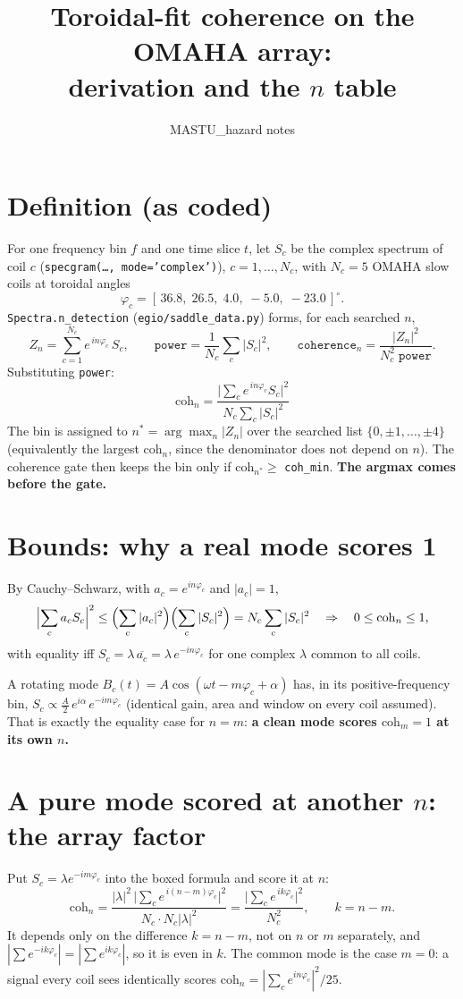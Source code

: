 \documentclass[11pt]{article}
\title{Toroidal-fit coherence on the OMAHA array:\\derivation and the $n$ table}
\author{MASTU\_hazard notes}
\date{}
\begin{document}
\maketitle

\section{Definition (as coded)}
For one frequency bin $f$ and one time slice $t$, let $S_c$ be the complex
spectrum of coil $c$ (\texttt{specgram(\ldots, mode='complex')}),
$c=1,\dots,N_c$, with $N_c=5$ OMAHA slow coils at toroidal angles
\[
\varphi_c = [\,36.8,\;26.5,\;4.0,\;-5.0,\;-23.0\,]^\circ .
\]
\texttt{Spectra.n\_detection} (\texttt{egio/saddle\_data.py}) forms, for each searched $n$,
\[
Z_n = \sum_{c=1}^{N_c} e^{\,i n\varphi_c}\, S_c ,
\qquad
\texttt{power} = \frac{1}{N_c}\sum_c |S_c|^2 ,
\qquad
\texttt{coherence}_n = \frac{|Z_n|^2}{N_c^2\;\texttt{power}} .
\]
Substituting \texttt{power}:
\[
\boxed{\;\mathrm{coh}_n = \frac{\bigl|\sum_c e^{\,i n\varphi_c} S_c\bigr|^2}{N_c \sum_c |S_c|^2}\;}
\]
The bin is assigned to $n^\ast = \arg\max_n |Z_n|$ over the searched list
$\{0,\pm1,\dots,\pm4\}$ (equivalently the largest $\mathrm{coh}_n$, since the
denominator does not depend on $n$). The coherence gate then keeps the bin
only if $\mathrm{coh}_{n^\ast}\ge$ \texttt{coh\_min}.
\textbf{The argmax comes before the gate.}

\section{Bounds: why a real mode scores 1}
By Cauchy--Schwarz, with $a_c = e^{in\varphi_c}$ and $|a_c|=1$,
\[
\Bigl|\sum_c a_c S_c\Bigr|^2 \le \Bigl(\sum_c |a_c|^2\Bigr)\Bigl(\sum_c |S_c|^2\Bigr) = N_c\sum_c|S_c|^2
\quad\Rightarrow\quad 0\le \mathrm{coh}_n\le 1 ,
\]
with equality iff $S_c = \lambda\,\overline{a_c} = \lambda\, e^{-in\varphi_c}$
for one complex $\lambda$ common to all coils.

A rotating mode $B_c(t)=A\cos(\omega t - m\varphi_c + \alpha)$ has, in its
positive-frequency bin, $S_c \propto \tfrac{A}{2}\,e^{i\alpha}\,e^{-im\varphi_c}$
(identical gain, area and window on every coil assumed). That is exactly the
equality case for $n=m$: \textbf{a clean mode scores $\mathrm{coh}_m = 1$ at
its own $n$.}

\section{A pure mode scored at another $n$: the array factor}
Put $S_c = \lambda e^{-im\varphi_c}$ into the boxed formula and score it at $n$:
\[
\mathrm{coh}_n
= \frac{|\lambda|^2\,\bigl|\sum_c e^{\,i(n-m)\varphi_c}\bigr|^2}{N_c\cdot N_c|\lambda|^2}
= \frac{\bigl|\sum_c e^{\,ik\varphi_c}\bigr|^2}{N_c^2},
\qquad k = n-m .
\]
It depends only on the difference $k=n-m$, not on $n$ or $m$ separately, and
$|{\textstyle\sum} e^{-ik\varphi_c}| = |{\textstyle\sum} e^{ik\varphi_c}|$, so it
is even in $k$. The common mode is the case $m=0$: a signal every coil sees
identically scores $\mathrm{coh}_n = |\sum_c e^{in\varphi_c}|^2/25$.
\end{document}
